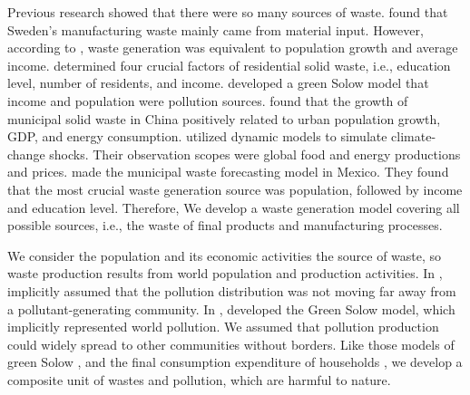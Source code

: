 \documentclass[sn-basic]{sn-jnl}%
\theoremstyle{thmstyleone}%
\theoremstyle{thmstyletwo}%
\theoremstyle{thmstylethree}%
\begin{document}
Previous research showed that there were so many sources of waste. \citet{bruvoll1997future} found that Sweden's manufacturing waste mainly came from material input. However, according to \citet{bandara2007relation}, waste generation was equivalent to population growth and average income. \citet{benitez2008mathematical} determined four crucial factors of residential solid waste, i.e., education level, number of residents, and income. \citet{brock2010green} developed a green Solow model that income and population were pollution sources. \citet{chhay2018municipal} found that the growth of municipal solid waste in China positively related to urban population growth, GDP, and energy consumption. \citet{pasqualino2019integrated} utilized dynamic models to simulate climate-change shocks. Their observation scopes were global food and energy productions and prices. \citet{araiza2020forecast} made the municipal waste forecasting model in Mexico. They found that the most crucial waste generation source was population, followed by income and education level. Therefore, We develop a waste generation model covering all possible sources, i.e., the waste of final products and manufacturing processes.

We consider the population and its economic activities the source of waste, so waste production results from world population and production activities. In \citeyear{copeland1994north}, \citeauthor{copeland1994north} implicitly assumed that the pollution distribution was not moving far away from a pollutant-generating community. In \citeyear{brock2010green}, \citeauthor{brock2010green} developed the Green Solow model, which implicitly represented world pollution. We assumed that pollution production could widely spread to other communities without borders. Like those models of green Solow \citep{brock2010green}, and the final consumption expenditure of households \citep{mazzanti2008waste}, we develop a composite unit of wastes and pollution, which are harmful to nature.
\end{document}
